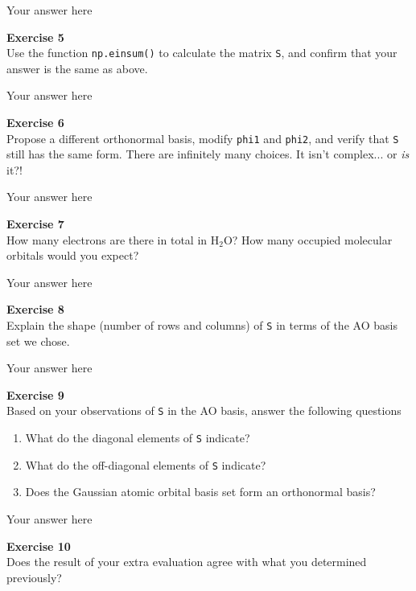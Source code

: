 \documentclass{article}
\begin{document}
Your answer here

\begin{mdframed}
\textbf{Exercise 5}\\
Use the function \texttt{np.einsum()} to calculate the matrix \texttt{S}, and confirm that your answer is the same as above.
\end{mdframed}

Your answer here

\begin{mdframed}
\textbf{Exercise 6}\\
Propose a different orthonormal basis, modify \texttt{phi1} and \texttt{phi2}, and verify that \texttt{S} still has the same form. There are infinitely many choices. It isn't complex... or \textit{is} it?!
\end{mdframed}

Your answer here

\begin{mdframed}
\textbf{Exercise 7}\\
How many electrons are there in total in H$_2$O?
How many occupied molecular orbitals would you expect?
\end{mdframed}

Your answer here

\begin{mdframed}
\textbf{Exercise 8}\\
Explain the shape (number of rows and columns) of \texttt{S} in terms of the AO basis set we chose.
\end{mdframed}

Your answer here

\begin{mdframed}
\textbf{Exercise 9}\\
Based on your observations of \texttt{S} in the AO basis, answer the following questions

\begin{enumerate}
\item What do the diagonal elements of \texttt{S} indicate?
\item What do the off-diagonal elements of \texttt{S} indicate?
\item Does the Gaussian atomic orbital basis set form an orthonormal basis?
\end{enumerate}
\end{mdframed}

Your answer here

\begin{mdframed}
\textbf{Exercise 10}\\
Does the result of your extra evaluation agree with what you determined previously?
\end{mdframed}
\end{document}
